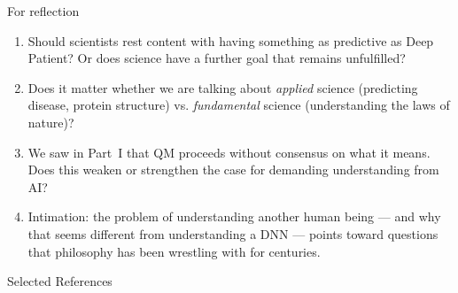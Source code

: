 \documentclass[fleql]{beamer}
\begin{document}
\begin{frame}{For reflection}

  \begin{enumerate}

  \item Should scientists rest content with having something as
    predictive as Deep Patient? Or does science have a further goal
    that remains unfulfilled?

  \item Does it matter whether we are talking about \emph{applied}
    science (predicting disease, protein structure) vs.
    \emph{fundamental} science (understanding the laws of nature)?

  \item We saw in Part~I that QM proceeds without consensus on
    what it means. Does this weaken or strengthen the case for
    demanding understanding from AI?

  \item Intimation: the problem of understanding another human
    being --- and why that seems different from understanding a DNN
    --- points toward questions that philosophy has been wrestling
    with for centuries.

  \end{enumerate}

\end{frame}

\nocite{*}

\begin{frame}[allowframebreaks]{Selected References}
\printbibliography[heading=none]
\end{frame}
\end{document}
